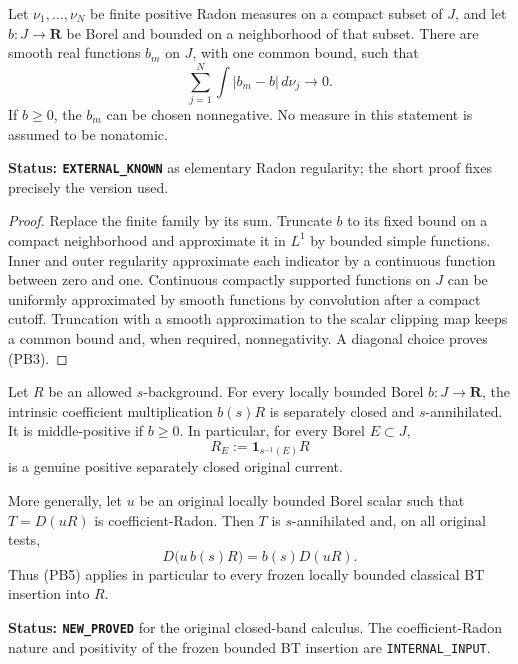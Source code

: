 \begin{lemma}
\label{lem:r12-parameter-L1-approximation}
Let $\nu_1,\ldots,\nu_N$ be finite positive Radon measures on a
compact subset of $J$, and let $b:J\to\mathbf R$ be Borel and
bounded on a neighborhood of that subset. There are smooth real
functions $b_m$ on $J$, with one common bound, such that
\[
                   \sum_{j=1}^N\int|b_m-b|\,d\nu_j\longrightarrow0.
 \tag{PB3}
\]
If $b\ge0$, the $b_m$ can be chosen nonnegative. No measure in this
statement is assumed to be nonatomic.
\end{lemma}

\noindent\textbf{Status: \texttt{EXTERNAL\_KNOWN}} as elementary
Radon regularity; the short proof fixes precisely the version used.

\begin{proof}
Replace the finite family by its sum. Truncate $b$ to its fixed
bound on a compact neighborhood and approximate it in $L^1$ by
bounded simple functions. Inner and outer regularity approximate
each indicator by a continuous function between zero and one.
Continuous compactly supported functions on $J$ can be uniformly
approximated by smooth functions by convolution after a compact
cutoff. Truncation with a smooth approximation to the scalar
clipping map keeps a common bound and, when required, nonnegativity.
A diagonal choice proves (PB3).
\end{proof}

\begin{theorem}
\label{thm:r12-closed-parameter-bands}
Let $R$ be an allowed $s$-background. For every locally bounded
Borel $b:J\to\mathbf R$, the intrinsic coefficient multiplication
$b(s)R$ is separately closed and $s$-annihilated. It is middle-positive
if $b\ge0$. In particular, for every Borel $E\subset J$,
\[
                            R_E:=\mathbf1_{s^{-1}(E)}R
 \tag{PB4}
\]
is a genuine positive separately closed original current.

More generally, let $u$ be an original locally bounded Borel scalar
such that $T=D(uR)$ is coefficient-Radon. Then $T$ is $s$-annihilated
and, on all original tests,
\[
                         D\bigl(u\,b(s)R\bigr)=b(s)D(uR).
 \tag{PB5}
\]
Thus (PB5) applies in particular to every frozen locally bounded
classical BT insertion into $R$.
\end{theorem}

\noindent\textbf{Status: \texttt{NEW\_PROVED}} for the original
closed-band calculus. The coefficient-Radon nature and positivity of
the frozen bounded BT insertion are \texttt{INTERNAL\_INPUT}.

